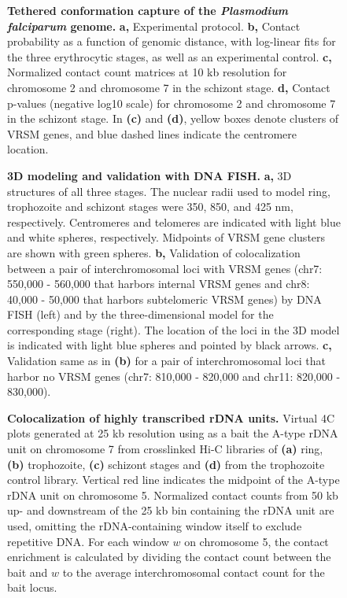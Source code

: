 \documentclass[10pt]{article}
\begin{document}
\begin{figure}[h]
\centering
\caption{{\bf Tethered conformation capture of the {\em Plasmodium falciparum} genome.}
\textbf{a,} Experimental protocol. \textbf{b,} Contact probability as a function of genomic distance, with log-linear fits for the three erythrocytic stages, as well as an experimental control. \textbf{c,} Normalized contact count matrices at 10 kb resolution for chromosome 2 and chromosome 7 in the schizont stage. \textbf{d,} Contact p-values (negative log10 scale) for chromosome 2 and chromosome 7 in the schizont stage. In \textbf{(c)} and \textbf{(d)}, yellow boxes denote clusters of VRSM genes, and blue dashed lines indicate the centromere location.}
\label{fig:fig1}
\end{figure}

\begin{figure}[h]
\centering
\caption{{\bf 3D modeling and validation with DNA FISH.}
 \textbf{a,} 3D structures of all three stages. The nuclear radii used to model ring, trophozoite and schizont stages were 350, 850, and 425 nm, respectively. Centromeres and telomeres are indicated with light blue and white spheres, respectively. Midpoints of VRSM gene clusters are shown with green spheres. \textbf{b,} Validation of colocalization between a pair of interchromosomal loci with VRSM genes (chr7: 550,000 - 560,000 that harbors internal VRSM genes and chr8: 40,000 - 50,000 that harbors subtelomeric VRSM genes) by DNA FISH (left) and by the three-dimensional model for the corresponding stage (right). The location of the loci in the 3D model is indicated with light blue spheres and pointed by black arrows. \textbf{c,} Validation same as in \textbf{(b)} for a pair of interchromosomal loci that harbor no VRSM genes (chr7: 810,000 - 820,000 and chr11: 820,000 - 830,000).
}
\label{fig:fig2}
\end{figure}

\begin{figure}[h]
\centering
\caption{{\bf Colocalization of highly transcribed rDNA units.}
 Virtual 4C plots generated at 25 kb resolution using as a bait the A-type rDNA unit on chromosome 7 from crosslinked Hi-C libraries of \textbf{(a)} ring, \textbf{(b)} trophozoite, \textbf{(c)} schizont stages and \textbf{(d)} from the trophozoite control library. Vertical red line indicates the midpoint of the A-type rDNA unit on chromosome 5. Normalized contact counts from 50 kb up- and downstream of the 25 kb bin containing the rDNA unit are used, omitting the rDNA-containing window itself to exclude repetitive DNA. For each window $w$ on chromosome 5, the contact enrichment is calculated by dividing the contact count between the bait and $w$ to the average interchromosomal contact count for the bait locus.
}
\label{fig:fig3}
\end{figure}
\end{document}
